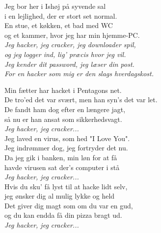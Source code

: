 \begin{flushleft}
Jeg bor her i Ishøj på syvende sal\\
i en lejlighed, der er stort set normal.\\
En stue, et køkken, et bad med WC\\
og et kammer, hvor jeg har min hjemme-PC.\\[5mm]

\emph{Jeg hacker, jeg cracker, jeg downloader spil,\\
og jeg logger ind, lig’ præcis hvor jeg vil.\\
Jeg kender dit password, jeg læser din post.\\
For en hacker som mig er den slags hverdagskost.\\[5mm]
}

Min fætter har hacket i Pentagons net.\\
De tro’ed det var svært, men han syn’s det var let.\\
De fandt ham dog efter en længere jagt,\\
så nu er han ansat som sikkerhedsvagt.\\[5mm]

\emph{Jeg hacker, jeg cracker...}\\[5mm]

Jeg laved en virus, som hed "I Love You".\\
Jeg indrømmer dog, jeg fortryder det nu.\\
Da jeg gik i banken, min løn for at få\\
havde virusen sat der’s computer i stå\\[5mm]

\emph{Jeg hacker, jeg cracker...}\\[5mm]

Hvis du sku’ få lyst til at hacke lidt selv,\\
jeg ønsker dig al mulig lykke og held\\
Det giver dig magt som om du var en gud,\\
og du kan endda få din pizza bragt ud.\\[5mm]

\emph{Jeg hacker, jeg cracker...}
\end{flushleft}

